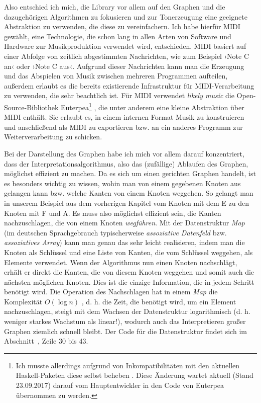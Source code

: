 \documentclass[a4paper,twocolumn]{article}
\begin{document}
Also entschied ich mich, die Library vor allem auf den Graphen und die
dazugehörigen Algorithmen zu fokusieren und zur Tonerzeugung eine geeignete
Abstraktion zu verwenden, die diese zu vereinfachern. Ich habe hierfür MIDI
gewählt, eine Technologie, die schon lang in allen Arten von Software und
Hardware zur Musikproduktion verwendet wird, entschieden. MIDI basiert auf einer
Abfolge von zeitlich abgestimmten Nachrichten, wie zum Beispiel ›Note C an‹ oder
›Note C aus‹. Aufgrund dieser Nachrichten kann man die Erzeugung und das
Abspielen von Musik zwischen mehreren Programmen aufteilen, außerdem erlaubt es
die bereits existierende Infrastruktur für MIDI-Verarbeitung zu verwenden, die
sehr beachtlich ist. Für MIDI verwendet {\it likely music} die
Open-Source-Bibliothek Euterpea\footnote{Ich musste allerdings aufgrund von
Inkompatibilitäten mit den aktuellen Haskell-Paketen diese selbst beheben
\cite{euterpea_fork}. Diese Änderung wartet \cite{euterpea_issue} aktuell (Stand
23.09.2017) darauf vom Hauptentwickler
in den Code von Euterpea übernommen zu werden.}
\cite{euterpea}, die unter anderem eine kleine Abstraktion über MIDI enthält.
Sie erlaubt es, in einem internen Format Musik zu
konstruieren und anschließend als MIDI zu exportieren bzw. an ein anderes
Programm zur Weiterverarbeitung zu schicken.

Bei der Darstellung des Graphen habe ich mich vor allem darauf konzentriert,
dass der Interpretationsalgorithmus, also das (zufällige) Ablaufen des Graphen,
möglichst effizient zu machen. Da es sich um einen gerichten Graphen handelt,
ist es besonders wichtig zu wissen, wohin man von einem gegebenen Knoten aus
gelangen kann bzw. welche Kanten von einem Knoten weggehen. So gelangt man in unserem Beispiel
aus dem vorherigen Kapitel vom Knoten mit dem E zu den Knoten mit F und
A. Es muss also möglichst effizient sein, die Kanten nachzuschlagen, die von
einem Knoten {\it wegführen}. Mit der Datenstruktur {\it Map} \cite{map} (im
deutschen Sprachgebrauch typischerweise {\it assoziative Datenfeld} bzw. {\it
assoziatives Array}) kann
man genau das sehr leicht realisieren, indem man die Knoten als Schlüssel und
eine Liste von Kanten, die vom Schlüssel weggehen, als Elemente verwendet. Wenn
der Algorithmus nun einen Knoten nachschlägt, erhält er direkt die Kanten, die
von diesem Knoten weggehen und somit auch die nächsten möglichen Knoten. Dies
ist die einzige Information, die in jedem Schritt benötigt wird. Die Operation
des Nachschlagen hat in einem {\it Map} die Komplexität $O(\log n)$
\cite{map_lookup}, d. h. die Zeit, die benötigt wird, um ein Element
nachzuschlagen, steigt mit dem Wachsen der Datenstruktur logarithmisch
(d. h. weniger starkes Wachstum als linear!), wodurch auch das Interpretieren 
großer Graphen ziemlich schnell bleibt. Der Code für die Datenstruktur findet
sich im Abschnitt~, Zeile 30 bis 43.
\end{document}
